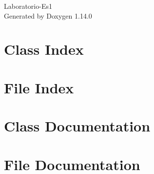 \documentclass[twoside]{book}
\newcommand{\+}{\discretionary{\mbox{\scriptsize$\hookleftarrow$}}{}{}}
\newcommand{\clearemptydoublepage}{%
    \newpage{\pagestyle{empty}\cleardoublepage}%
  }
\begin{document}
  \raggedbottom
    \hypersetup{pageanchor=false,
                bookmarksnumbered=true,
                pdfencoding=unicode
               }
  \begin{titlepage}
  \vspace*{7cm}
  \begin{center}%
  {\Large Laboratorio-\/\+Es1}\\
  \vspace*{1cm}
  {\large Generated by Doxygen 1.14.0}\\
  \end{center}
  \end{titlepage}
  \clearemptydoublepage
  \tableofcontents
  \clearemptydoublepage
  \hypersetup{pageanchor=true}
\chapter{Class Index}

\chapter{File Index}

\chapter{Class Documentation}

\chapter{File Documentation}




  \backmatter
  \newpage
  \clearemptydoublepage
  \printindex
\end{document}
